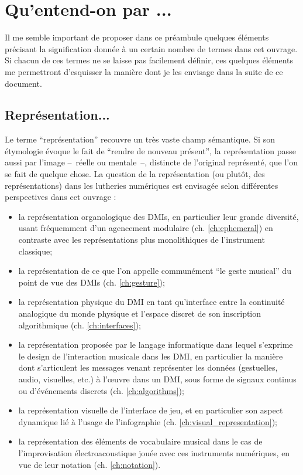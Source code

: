 \section{Qu'entend-on par ...}

\noindent Il me semble important de proposer dans ce préambule quelques éléments précisant la signification donnée à un certain nombre de termes dans cet ouvrage. Si chacun de ces termes ne se laisse pas facilement définir, ces quelques éléments me permettront d'esquisser la manière dont je les envisage dans la suite de ce document.

\subsection*{Représentation...}

\noindent Le terme ``représentation'' recouvre un très vaste champ sémantique. Si son étymologie évoque le fait de ``rendre de nouveau présent'', la représentation passe aussi par l'image --~réelle ou mentale~--, distincte de l'original représenté, que l'on se fait de quelque chose. La question de la représentation (ou plutôt, des représentations) dans les lutheries numériques est envisagée selon différentes perspectives dans cet ouvrage : 
\vspace{-1em}
\begin{itemize}[noitemsep]
\item la représentation organologique des \glspl{DMI}, en particulier leur grande diversité, usant fréquemment d'un agencement modulaire (ch. \ref{ch:ephemeral}) en contraste avec les représentations plus monolithiques de l'instrument classique;
\item la représentation de ce que l'on appelle communément ``le geste musical'' du point de vue des \glspl{DMI} (ch. \ref{ch:gesture});
\item la représentation physique du \gls{DMI} en tant qu'interface entre la continuité analogique du monde physique et l'espace discret de son inscription algorithmique (ch. \ref{ch:interfaces});
\item la représentation proposée par le langage informatique dans lequel s'exprime le design de l'interaction musicale dans les \gls{DMI}, en particulier la manière dont s'articulent les messages venant représenter les données (gestuelles, audio, visuelles, etc.) à l'œuvre dans un \gls{DMI}, sous forme de signaux continus ou d'événements discrets (ch. \ref{ch:algorithms});
\item la représentation visuelle de l'interface de jeu, et en particulier son aspect dynamique lié à l'usage de l'infographie (ch. \ref{ch:visual_representation});
\item la représentation des éléments de vocabulaire musical dans le cas de l'improvisation électroacoustique jouée avec ces instruments numériques, en vue de leur notation (ch. \ref{ch:notation}).
\end{itemize}

